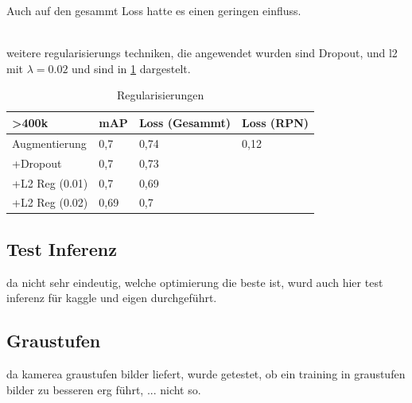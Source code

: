 Auch auf den gesammt Loss hatte es einen geringen
einfluss.
\\[1cm]
\begin{minipage}{0.5\textwidth}
  \centering
  \label{plot:map}
  \def\svgwidth{0.9\textwidth}
  
\end{minipage}
\begin{minipage}{0.5\textwidth}
  \centering
  \label{plot:loss}
  \def\svgwidth{0.9\textwidth}
  
\end{minipage}
\\[1cm]
weitere regularisierungs techniken, die angewendet wurden 
sind Dropout, und l2 mit $\lambda = 0.02$ und sind in 
\ref{table:reg} dargestelt.



\begin{table}[htb]
  \centering
  \label{table:reg}
  \begin{tabular}{m{}|m{}<{\centering}m{}<{\centering}m{}<{\centering}}
  \hline
  \textgreater 400k & mAP  & Loss (Gesammt) & Loss (RPN) \\ \hline\hline
  Augmentierung     & 0,7  & 0,74           &  0,12          \\
  +Dropout          & 0,7  & 0,73           &            \\
  +L2 Reg (0.01)    & 0,7  & 0,69           &            \\
  +L2 Reg (0.02)    & 0,69 & 0,7            &            \\ \hline
  \end{tabular}
  \caption{Regularisierungen}
\end{table}

\subsection{Test Inferenz}
da nicht sehr eindeutig, welche optimierung die 
beste ist, wurd auch hier test inferenz für 
kaggle und eigen durchgeführt.



\subsection{Graustufen}
da kamerea graustufen bilder liefert, wurde getestet, ob ein 
training in graustufen bilder zu besseren erg führt, ... nicht so.



